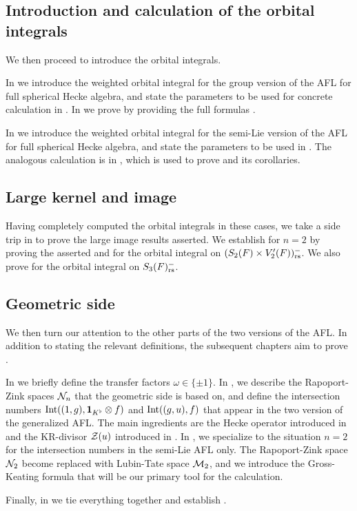 \subsection{Introduction and calculation of the orbital integrals}
We then proceed to introduce the orbital integrals.
\begin{itemize}
  \ii In  we introduce the weighted orbital integral
  for the group version of the AFL for full spherical Hecke algebra,
  and state the parameters to be used for concrete calculation in .
  In  we prove 
  by providing the full formulas
  .

  \ii In  we introduce the weighted orbital integral
  for the semi-Lie version of the AFL for full spherical Hecke algebra,
  and state the parameters to be used in .
  The analogous calculation is in ,
  which is used to prove  and its corollaries.
\end{itemize}

\subsection{Large kernel and image}
Having completely computed the orbital integrals in these cases,
we take a side trip in  to prove the large image results asserted.
We establish  for $n = 2$ by proving the asserted
 and 
for the orbital integral on $(S_2(F) \times V'_2(F))_{\mathrm{rs}}^-$.
We also prove  for the orbital integral on $S_3(F)_{\mathrm{rs}}^-$.

\subsection{Geometric side}
We then turn our attention to the other parts of the two versions of the AFL.
In addition to stating the relevant definitions,
the subsequent chapters aim to prove .
\begin{itemize}
  \ii In  we briefly define the transfer factors $\omega \in \{\pm1\}$.
  \ii In , we describe the Rapoport-Zink spaces $\mathcal N_n$
  that the geometric side is based on, and define the intersection numbers
  $\operatorname{Int}((1,g), \mathbf{1}_{K^\flat} \otimes f)$ and $\operatorname{Int}((g,u), f)$
  that appear in the two version of the generalized AFL.
  The main ingredients are the Hecke operator introduced in \cite{ref:AFLspherical}
  and the KR-divisor $\mathcal Z(u)$ introduced in \cite{ref:KR}.
  \ii In , we specialize to the situation $n = 2$
  for the intersection numbers in the semi-Lie AFL only.
  The Rapoport-Zink space $\mathcal N_2$ become replaced with Lubin-Tate space $\mathcal M_2$,
  and we introduce the Gross-Keating formula
  that will be our primary tool for the calculation.
\end{itemize}
Finally, in  we tie everything together and establish
.

